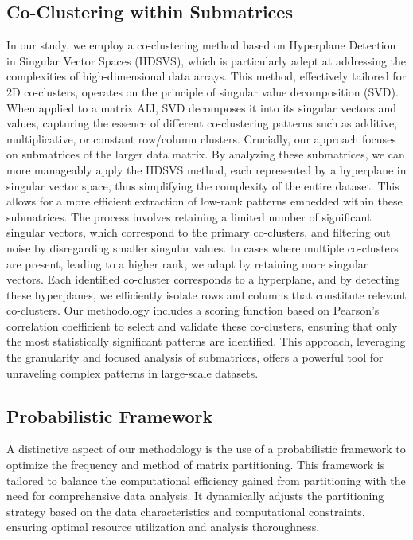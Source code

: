 \subsection{Co-Clustering within Submatrices}
In our study, we employ a co-clustering method based on Hyperplane Detection in Singular Vector Spaces (HDSVS), which is particularly adept at addressing the complexities of high-dimensional data arrays. This method, effectively tailored for 2D co-clusters, operates on the principle of singular value decomposition (SVD). When applied to a matrix AIJ, SVD decomposes it into its singular vectors and values, capturing the essence of different co-clustering patterns such as additive, multiplicative, or constant row/column clusters. Crucially, our approach focuses on submatrices of the larger data matrix. By analyzing these submatrices, we can more manageably apply the HDSVS method, each represented by a hyperplane in singular vector space, thus simplifying the complexity of the entire dataset. This allows for a more efficient extraction of low-rank patterns embedded within these submatrices. The process involves retaining a limited number of significant singular vectors, which correspond to the primary co-clusters, and filtering out noise by disregarding smaller singular values. In cases where multiple co-clusters are present, leading to a higher rank, we adapt by retaining more singular vectors. Each identified co-cluster corresponds to a hyperplane, and by detecting these hyperplanes, we efficiently isolate rows and columns that constitute relevant co-clusters. Our methodology includes a scoring function based on Pearson’s correlation coefficient to select and validate these co-clusters, ensuring that only the most statistically significant patterns are identified. This approach, leveraging the granularity and focused analysis of submatrices, offers a powerful tool for unraveling complex patterns in large-scale datasets.

\subsection{Probabilistic Framework}
A distinctive aspect of our methodology is the use of a probabilistic framework to optimize the frequency and method of matrix partitioning. This framework is tailored to balance the computational efficiency gained from partitioning with the need for comprehensive data analysis. It dynamically adjusts the partitioning strategy based on the data characteristics and computational constraints, ensuring optimal resource utilization and analysis thoroughness.


